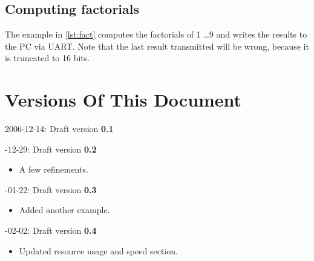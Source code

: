 \documentclass[10pt, twoside, a4paper]{article}
\begin{document}
  \subsection{Computing factorials}

  The example in \ref{lst:fact} computes the factorials of 1 \ldots 9
  and writes the results to the PC via UART. Note that the last result
  transmitted will be wrong, because it is truncated to 16 bits.

  \lstset{basicstyle=\footnotesize,numbers=left,numberstyle=\tiny}
  \lstset{caption=Computing factorials}
  \lstset{label=lst:fact}
  
  

  \section{Versions Of This Document}
  
  2006-12-14: Draft version \textbf{0.1}

  -12-29: Draft version \textbf{0.2}
  \begin{itemize}
    \item A few refinements.
  \end{itemize}

  -01-22: Draft version \textbf{0.3}
  \begin{itemize}
    \item Added another example.
  \end{itemize}

  -02-02: Draft version \textbf{0.4}
  \begin{itemize}
    \item Updated resource usage and speed section.
  \end{itemize}
\end{document}

